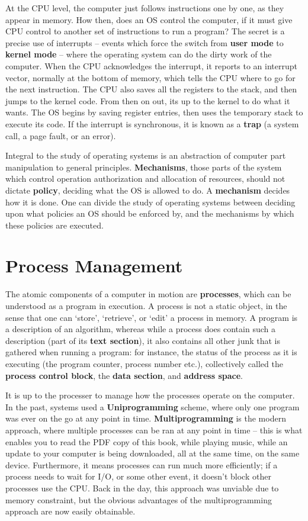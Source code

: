 At the CPU level, the computer just follows instructions one by one, as they appear in memory. How then, does an OS control the computer, if it must give CPU control to another set of instructions to run a program? The secret is a precise use of interrupts -- events which force the switch from {\bf user mode} to {\bf kernel mode} -- where the operating system can do the dirty work of the computer. When the CPU acknowledges the interrupt, it reports to an interrupt vector, normally at the bottom of memory, which tells the CPU where to go for the next instruction. The CPU also saves all the registers to the stack, and then jumps to the kernel code. From then on out, its up to the kernel to do what it wants. The OS begins by saving register entries, then uses the temporary stack to execute its code. If the interrupt is synchronous, it is known as a {\bf trap} (a system call, a page fault, or an error).

Integral to the study of operating systems is an abstraction of computer part manipulation to general principles. {\bf Mechanisms}, those parts of the system which control operation authorization and allocation of resources, should not dictate {\bf policy}, deciding what the OS is allowed to do. A {\bf mechanism} decides how it is done. One can divide the study of operating systems between deciding upon what policies an OS should be enforced by, and the mechanisms by which these policies are executed.

\chapter{Process Management}

The atomic components of a computer in motion are {\bf processes}, which can be understood as a program in execution. A process is not a static object, in the sense that one can `store', `retrieve', or `edit' a process in memory. A program is a description of an algorithm, whereas while a process does contain such a description (part of its {\bf text section}), it also contains all other junk that is gathered when running a program: for instance, the status of the process as it is executing (the program counter, process number etc.), collectively called the {\bf process control block}, the {\bf data section}, and {\bf address space}.

It is up to the processer to manage how the processes operate on the computer. In the past, systems used a {\bf Uniprogramming} scheme, where only one program was ever on the go at any point in time. {\bf Multiprogramming} is the modern approach, where multiple processes can be ran at any point in time -- this is what enables you to read the PDF copy of this book, while playing music, while an update to your computer is being downloaded, all at the same time, on the same device. Furthermore, it means processes can run much more efficiently; if a process needs to wait for I/O, or some other event, it doesn't block other processes use the CPU. Back in the day, this approach was unviable due to memory constraint, but the obvious advantages of the multiprogramming approach are now easily obtainable.

